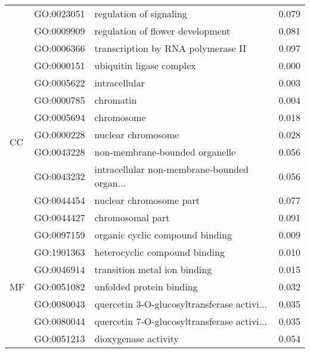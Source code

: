 \begin{longtable}{lllr}
   & GO:0023051 &                      regulation of signaling &         0.079 \\
   & GO:0009909 &             regulation of flower development &         0.081 \\
   & GO:0006366 &           transcription by RNA polymerase II &         0.097 \\
\cline{1-4}
\multirow{9}{*}{CC} & GO:0000151 &                     ubiquitin ligase complex &         0.000 \\
   & GO:0005622 &                                intracellular &         0.003 \\
   & GO:0000785 &                                    chromatin &         0.004 \\
   & GO:0005694 &                                   chromosome &         0.018 \\
   & GO:0000228 &                           nuclear chromosome &         0.028 \\
   & GO:0043228 &               non-membrane-bounded organelle &         0.056 \\
   & GO:0043232 &  intracellular non-membrane-bounded organ... &         0.056 \\
   & GO:0044454 &                      nuclear chromosome part &         0.077 \\
   & GO:0044427 &                             chromosomal part &         0.091 \\
\cline{1-4}
\multirow{7}{*}{MF} & GO:0097159 &              organic cyclic compound binding &         0.009 \\
   & GO:1901363 &                heterocyclic compound binding &         0.010 \\
   & GO:0046914 &                 transition metal ion binding &         0.015 \\
   & GO:0051082 &                     unfolded protein binding &         0.032 \\
   & GO:0080043 &  quercetin 3-O-glucosyltransferase activi... &         0.035 \\
   & GO:0080044 &  quercetin 7-O-glucosyltransferase activi... &         0.035 \\
   & GO:0051213 &                         dioxygenase activity &         0.054 \\
\end{longtable}
